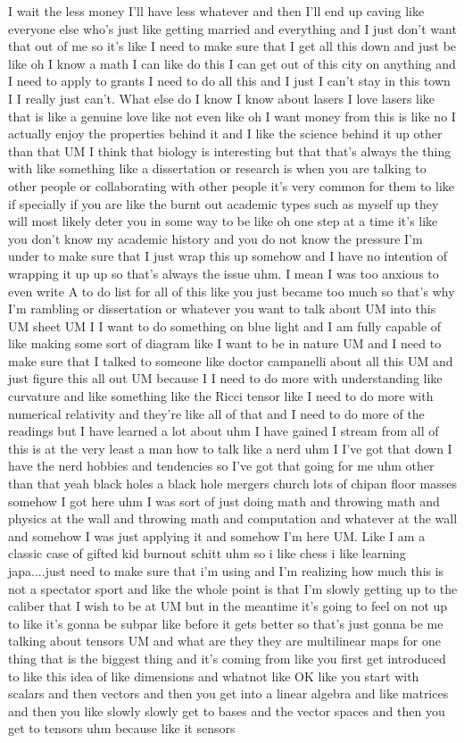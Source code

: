 I wait the less money I'll have less whatever and then I'll end up caving like everyone else who's just like getting married and everything and I just don't want that out of me so it's like I need to make sure that I get all this down and just be like oh I know a math I can like do this I can get out of this city on anything and I need to apply to grants I need to do all this and I just I can't stay in this town I I really just can't. What else do I know I know about lasers I love lasers like that is like a genuine love like not even like oh I want money from this is like no I actually enjoy the properties behind it and I like the science behind it up other than that UM I think that biology is interesting but that that's always the thing with like something like a dissertation or research is when you are talking to other people or collaborating with other people it's very common for them to like if specially if you are like the burnt out academic types such as myself up they will most likely deter you in some way to be like oh one step at a time it's like you don't know my academic history and you do not know the pressure I'm under to make sure that I just wrap this up somehow and I have no intention of wrapping it up up so that's always the issue uhm. I mean I was too anxious to even write A to do list for all of this like you just became too much so that's why I'm rambling or dissertation or whatever you want to talk about UM into this UM sheet UM I I want to do something on blue light and I am fully capable of like making some sort of diagram like I want to be in nature UM and I need to make sure that I talked to someone like doctor campanelli about all this UM and just figure this all out UM because I I need to do more with understanding like curvature and like something like the Ricci tensor like I need to do more with numerical relativity and they're like all of that and I need to do more of the readings but I have learned a lot about uhm I have gained I stream from all of this is at the very least a man how to talk like a nerd uhm I I've got that down I have the nerd hobbies and tendencies so I've got that going for me uhm other than that yeah black holes a black hole mergers church lots of chipan floor masses somehow I got here uhm I was sort of just doing math and throwing math and physics at the wall and throwing math and computation and whatever at the wall and somehow I was just applying it and somehow I'm here UM. Like I am a classic case of gifted kid burnout schitt uhm so i like chess i like learning japa....just need to make sure that i'm using and I'm realizing how much this is not a spectator sport and like the whole point is that I'm slowly getting up to the caliber that I wish to be at UM but in the meantime it's going to feel on not up to like it's gonna be subpar like before it gets better so that's just gonna be me talking about tensors UM and what are they they are multilinear maps for one thing that is the biggest thing and it's coming from like you first get introduced to like this idea of like dimensions and whatnot like OK like you start with scalars and then vectors and then you get into a linear algebra and like matrices and then you like slowly slowly get to bases and the vector spaces and then you get to tensors uhm because like it sensors 